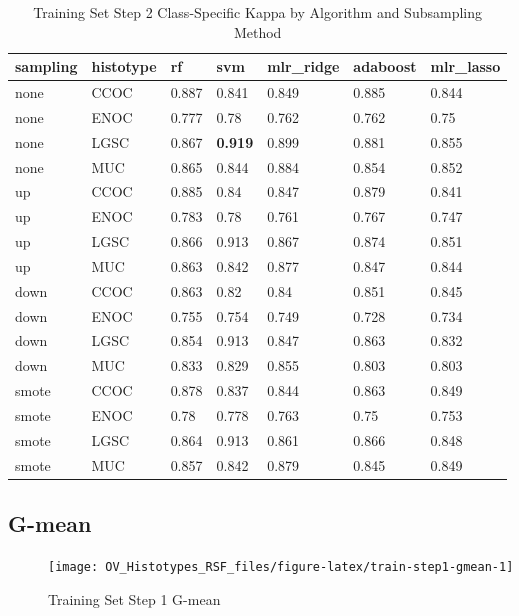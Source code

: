 \documentclass[
]{report}
\begin{document}
\begin{table}

\caption{\label{tab:train-step2-kappa-class-table}Training Set Step 2 Class-Specific Kappa by Algorithm and Subsampling Method}
\centering
\begin{tabular}[t]{l|l|l|l|l|l|l}
\hline
sampling & histotype & rf & svm & mlr\_ridge & adaboost & mlr\_lasso\\
\hline
none & CCOC & 0.887 & 0.841 & 0.849 & 0.885 & 0.844\\
\hline
none & ENOC & 0.777 & 0.78 & 0.762 & 0.762 & 0.75\\
\hline
none & LGSC & 0.867 & \textbf{0.919} & 0.899 & 0.881 & 0.855\\
\hline
none & MUC & 0.865 & 0.844 & 0.884 & 0.854 & 0.852\\
\hline
up & CCOC & 0.885 & 0.84 & 0.847 & 0.879 & 0.841\\
\hline
up & ENOC & 0.783 & 0.78 & 0.761 & 0.767 & 0.747\\
\hline
up & LGSC & 0.866 & 0.913 & 0.867 & 0.874 & 0.851\\
\hline
up & MUC & 0.863 & 0.842 & 0.877 & 0.847 & 0.844\\
\hline
down & CCOC & 0.863 & 0.82 & 0.84 & 0.851 & 0.845\\
\hline
down & ENOC & 0.755 & 0.754 & 0.749 & 0.728 & 0.734\\
\hline
down & LGSC & 0.854 & 0.913 & 0.847 & 0.863 & 0.832\\
\hline
down & MUC & 0.833 & 0.829 & 0.855 & 0.803 & 0.803\\
\hline
smote & CCOC & 0.878 & 0.837 & 0.844 & 0.863 & 0.849\\
\hline
smote & ENOC & 0.78 & 0.778 & 0.763 & 0.75 & 0.753\\
\hline
smote & LGSC & 0.864 & 0.913 & 0.861 & 0.866 & 0.848\\
\hline
smote & MUC & 0.857 & 0.842 & 0.879 & 0.845 & 0.849\\
\hline
\end{tabular}
\end{table}

\hypertarget{g-mean-1}{%
\subsection{G-mean}\label{g-mean-1}}

\begin{figure}[H]

{\centering \texttt{[image: OV\_Histotypes\_RSF\_files/figure-latex/train-step1-gmean-1]} 

}

\caption{Training Set Step 1 G-mean}\label{fig:train-step1-gmean}
\end{figure}
\end{document}
